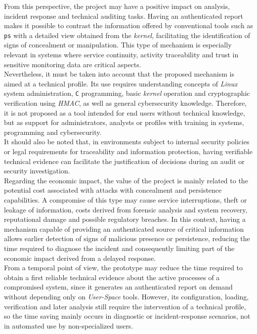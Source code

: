 From this perspective, the project may have a positive impact on analysis, incident response and technical auditing tasks.
Having an authenticated report makes it possible to contrast the information offered by conventional tools such as \texttt{ps} with a detailed view obtained from the \textit{kernel}, facilitating the identification of signs of concealment or manipulation.
This type of mechanism is especially relevant in systems where service continuity, activity traceability and trust in sensitive monitoring data are critical aspects.\\

Nevertheless, it must be taken into account that the proposed mechanism is aimed at a technical profile.
Its use requires understanding concepts of \textit{Linux} system administration, \texttt{C} programming, basic \textit{kernel} operation and cryptographic verification using \textit{HMAC}, as well as general cybersecurity knowledge.
Therefore, it is not proposed as a tool intended for end users without technical knowledge, but as support for administrators, analysts or profiles with training in systems, programming and cybersecurity.\\

It should also be noted that, in environments subject to internal security policies or legal requirements for traceability and information protection, having verifiable technical evidence can facilitate the justification of decisions during an audit or security investigation.\\

Regarding the economic impact, the value of the project is mainly related to the potential cost associated with attacks with concealment and persistence capabilities.
A compromise of this type may cause service interruptions, theft or leakage of information, costs derived from forensic analysis and system recovery, reputational damage and possible regulatory breaches.
In this context, having a mechanism capable of providing an authenticated source of critical information allows earlier detection of signs of malicious presence or persistence, reducing the time required to diagnose the incident and consequently limiting part of the economic impact derived from a delayed response.\\

From a temporal point of view, the prototype may reduce the time required to obtain a first reliable technical evidence about the active processes of a compromised system, since it generates an authenticated report on demand without depending only on \textit{User-Space} tools.
However, its configuration, loading, verification and later analysis still require the intervention of a technical profile, so the time saving mainly occurs in diagnostic or incident-response scenarios, not in automated use by non-specialized users.\\

